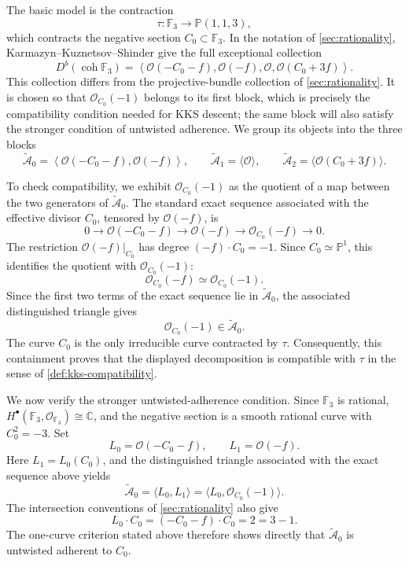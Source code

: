 \documentclass[11pt]{article}
\theoremstyle{plain}
\theoremstyle{definition}
\theoremstyle{remark}
\newcommand{\Pp}{\mathbb P}
\newcommand{\F}{\mathbb F}
\newcommand{\C}{\mathbb C}
\newcommand{\Db}{D^b}
\newcommand{\coh}{\operatorname{coh}}
\newcommand{\OO}{\mathcal O}
\begin{document}
The basic model is the contraction
\[
\tau:\F_3\longrightarrow \Pp(1,1,3),
\]
which contracts the negative section \(C_0\subset\F_3\). In the notation of
\cref{sec:rationality}, Karmazyn--Kuznetsov--Shinder give the full exceptional
collection \cite[Example~3.17]{KKS2020}
\[
\Db(\coh \F_3)
=
\left\langle
\OO(-C_0-f),\OO(-f),\OO,\OO(C_0+3f)
\right\rangle .
\]
This collection differs from the projective-bundle collection of
\cref{sec:rationality}. It is chosen so that \(\OO_{C_0}(-1)\) belongs to its
first block, which is precisely the compatibility condition needed for KKS
descent; the same block will also satisfy the stronger condition of untwisted
adherence. We group its objects into the three blocks
\[
\widetilde{\mathcal A}_0
=
\left\langle
\OO(-C_0-f),\OO(-f)
\right\rangle,
\qquad
\widetilde{\mathcal A}_1=\langle \OO\rangle,
\qquad
\widetilde{\mathcal A}_2=\langle \OO(C_0+3f)\rangle .
\]

To check compatibility, we exhibit \(\OO_{C_0}(-1)\) as the quotient
of a map between the two generators of \(\widetilde{\mathcal A}_0\).
The standard exact sequence associated with the effective divisor
\(C_0\), tensored by \(\OO(-f)\), is
\[
0
\longrightarrow
\OO(-C_0-f)
\longrightarrow
\OO(-f)
\longrightarrow
\OO_{C_0}(-f)
\longrightarrow
0.
\]
The restriction \(\OO(-f)|_{C_0}\) has degree
\((-f)\cdot C_0=-1\). Since \(C_0\simeq\Pp^1\), this identifies the quotient
with \(\OO_{C_0}(-1)\):
\[
\OO_{C_0}(-f)\simeq\OO_{C_0}(-1).
\]
Since the first two terms of the exact sequence lie in
\(\widetilde{\mathcal A}_0\), the associated distinguished triangle gives
\[
\OO_{C_0}(-1)\in \widetilde{\mathcal A}_0.
\]
The curve \(C_0\) is the only irreducible curve contracted by \(\tau\).
Consequently, this containment proves that the displayed decomposition is
compatible with \(\tau\) in the sense of
\cref{def:kks-compatibility}.

We now verify the stronger untwisted-adherence condition. Since \(\F_3\) is
rational, \(H^\bullet(\F_3,\OO_{\F_3})\cong\C\), and the negative section is
a smooth rational curve with \(C_0^2=-3\). Set
\[
L_0=\OO(-C_0-f),
\qquad
L_1=\OO(-f).
\]
Here \(L_1=L_0(C_0)\), and the distinguished triangle associated with the
exact sequence above yields
\[
\widetilde{\mathcal A}_0
=
\langle L_0,L_1\rangle
=
\langle L_0,\OO_{C_0}(-1)\rangle.
\]
The intersection conventions of \cref{sec:rationality} also give
\[
L_0\cdot C_0
=
(-C_0-f)\cdot C_0
=
2
=
3-1.
\]
The one-curve criterion stated above therefore shows directly that
\(\widetilde{\mathcal A}_0\) is untwisted adherent to \(C_0\).
\end{document}
